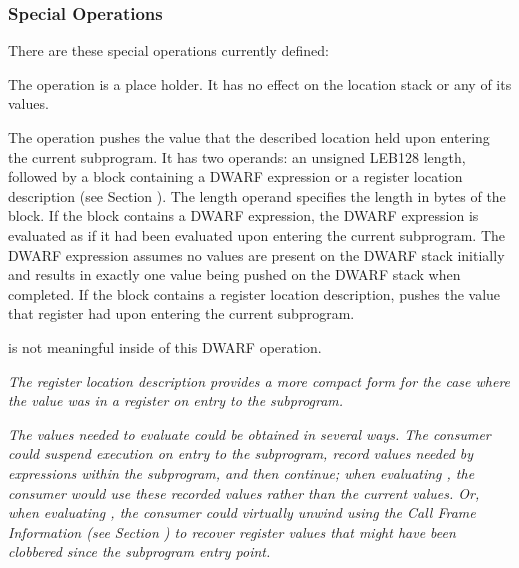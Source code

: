 \subsubsection{Special Operations}
\label{chap:specialoperations}
There 
are these special operations currently defined:
\begin{enumerate}[1. ]
\itembfnl{\DWOPnopTARG}
The \DWOPnopNAME{} operation is a place holder. It has no effect
on the location stack or any of its values.

\itembfnl{\DWOPentryvalueTARG}
The \DWOPentryvalueNAME{} operation pushes 
the value that the described location held
upon entering the current subprogram.  It has two operands: an 
unsigned LEB128 length, followed by 
a block containing a DWARF expression or a register location description 
(see Section ).  
The length operand specifies the length in bytes of the block. 
If the block contains a DWARF expression,
the DWARF expression is evaluated as if it had been evaluated upon entering
the current subprogram.  The DWARF expression 
assumes no values are present on the DWARF stack initially and results
in exactly one value being pushed on the DWARF stack when completed.
If the block contains a register location
description, \DWOPentryvalueNAME{} pushes the value that register had upon
entering the current subprogram. 

\DWOPpushobjectaddress{} is not meaningful inside of this DWARF operation.

\textit{ 
The register location description provides a more compact form for the
case where the value was in a register on entry to the subprogram.
}

\textit{The values needed to evaluate \DWOPentryvalueNAME{} could be obtained in
several ways. The consumer could suspend execution on entry to the
subprogram, record values needed by \DWOPentryvalueNAME{} expressions within
the subprogram, and then continue; when evaluating \DWOPentryvalueNAME{},
the consumer would use these recorded values rather than the current
values.  Or, when evaluating \DWOPentryvalueNAME{}, the consumer could
virtually unwind using the Call Frame Information 
(see Section ) 
to recover register values that might have been clobbered since the
subprogram entry point.}

\end{enumerate}

